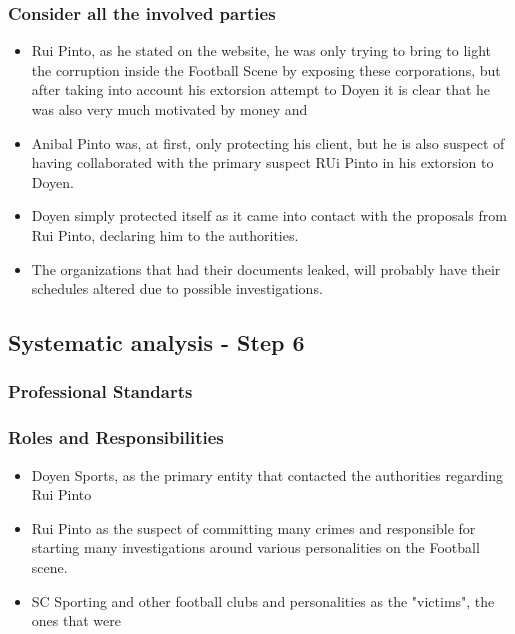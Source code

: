 \subsubsection{Consider all the involved parties}
\begin{itemize}
    \item Rui Pinto, as he stated on the website, he was only trying to bring to light the corruption inside the Football Scene by exposing these corporations, but after taking into account his extorsion attempt to Doyen it is clear that he was also very much motivated by money and 
    \item Anibal Pinto was, at first, only protecting his client, but he is also suspect of having collaborated with the primary suspect RUi Pinto in his extorsion to Doyen.
    \item Doyen simply protected itself as it came into contact with the proposals from Rui Pinto, declaring him to the authorities.
    \item The organizations that had their documents leaked, will probably have their schedules altered due to possible investigations.
\end{itemize}

\subsection{Systematic analysis - Step 6}

\subsubsection{Professional Standarts}

\subsubsection{Roles and Responsibilities}

\begin{itemize}
    \item Doyen Sports, as the primary entity that contacted the authorities regarding Rui Pinto
    \item Rui Pinto as the suspect of committing many crimes and responsible for starting many investigations around various personalities on the Football scene.
    \item SC Sporting and other football clubs and personalities as the "victims", the ones that were 
    
\end{itemize}

